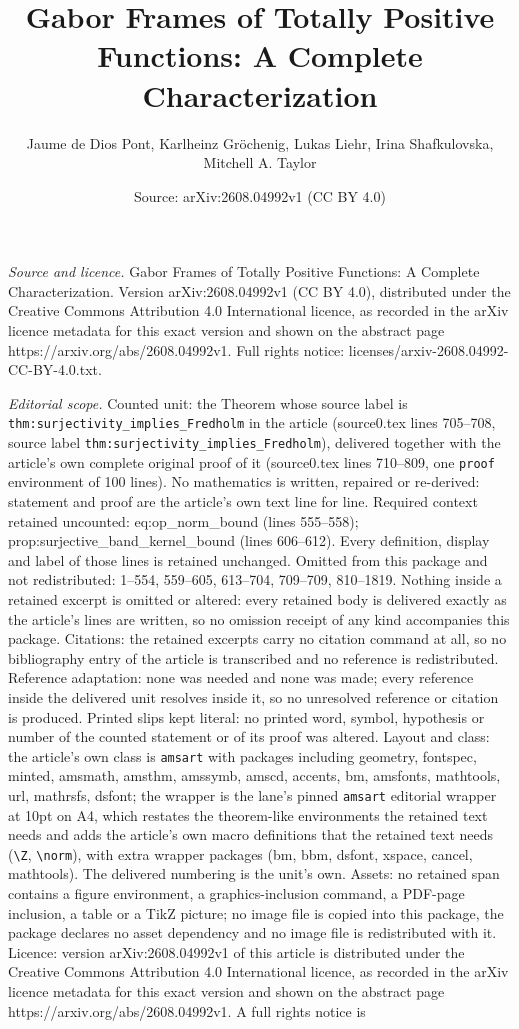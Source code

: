\documentclass[10pt,a4paper]{amsart}
\title[Gabor Frames of Totally Positive Functions: A Complete Chara]{Gabor Frames of Totally Positive Functions: A Complete Characterization}
\author{Jaume de Dios Pont, Karlheinz Gr\"ochenig, Lukas Liehr, Irina Shafkulovska, Mitchell A. Taylor}
\date{Source: arXiv:2608.04992v1 (CC BY 4.0)}
\begin{document}
\maketitle

\noindent\emph{Source and licence.} Gabor Frames of Totally Positive Functions: A Complete Characterization. Version arXiv:2608.04992v1 (CC BY 4.0), distributed under the Creative Commons Attribution 4.0 International licence, as recorded in the arXiv licence metadata for this exact version and shown on the abstract page https://arxiv.org/abs/2608.04992v1. Full rights notice: licenses/arxiv-2608.04992-CC-BY-4.0.txt.\par\smallskip

\noindent\textit{Editorial scope.} Counted unit: the Theorem whose source label is \texttt{thm:surjectivity\_implies\_Fredholm} in the article (source0.tex lines 705--708, source label \texttt{thm:surjectivity\_implies\_Fredholm}), delivered together with the article's own complete original proof of it (source0.tex lines 710--809, one \texttt{proof} environment of 100 lines). No mathematics is written, repaired or re-derived: statement and proof are the article's own text line for line. Required context retained uncounted: eq:op\_norm\_bound (lines 555--558); prop:surjective\_band\_kernel\_bound (lines 606--612). Every definition, display and label of those lines is retained unchanged. Omitted from this package and not redistributed: 1--554, 559--605, 613--704, 709--709, 810--1819. Nothing inside a retained excerpt is omitted or altered: every retained body is delivered exactly as the article's lines are written, so no omission receipt of any kind accompanies this package. Citations: the retained excerpts carry no citation command at all, so no bibliography entry of the article is transcribed and no reference is redistributed. Reference adaptation: none was needed and none was made; every reference inside the delivered unit resolves inside it, so no unresolved reference or citation is produced. Printed slips kept literal: no printed word, symbol, hypothesis or number of the counted statement or of its proof was altered. Layout and class: the article's own class is \texttt{amsart} with packages including geometry, fontspec, minted, amsmath, amsthm, amssymb, amscd, accents, bm, amsfonts, mathtools, url, mathrsfs, dsfont; the wrapper is the lane's pinned \texttt{amsart} editorial wrapper at 10pt on A4, which restates the theorem-like environments the retained text needs and adds the article's own macro definitions that the retained text needs (\texttt{\textbackslash Z}, \texttt{\textbackslash norm}), with extra wrapper packages (bm, bbm, dsfont, xspace, cancel, mathtools). The delivered numbering is the unit's own. Assets: no retained span contains a figure environment, a graphics-inclusion command, a PDF-page inclusion, a table or a TikZ picture; no image file is copied into this package, the package declares no asset dependency and no image file is redistributed with it. Licence: version arXiv:2608.04992v1 of this article is distributed under the Creative Commons Attribution 4.0 International licence, as recorded in the arXiv licence metadata for this exact version and shown on the abstract page https://arxiv.org/abs/2608.04992v1. A full rights notice is 
\end{document}
